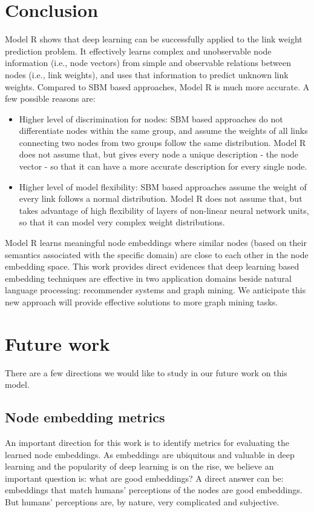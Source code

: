 \documentclass[book,12pt]{WSUThesis}
\theoremstyle{definition}
\begin{document}
\section{Conclusion}
Model R shows that deep learning can be successfully applied to the link weight prediction problem.
It effectively learns complex and unobservable node information (i.e., node vectors) from simple and observable relations between nodes (i.e., link weights),
and uses that information to predict unknown link weights.
Compared to SBM based approaches, Model R is much more accurate.
A few possible reasons are:
\begin{itemize}
	\item Higher level of discrimination for nodes:
	SBM based approaches do not differentiate nodes within the same group,
	and assume the weights of all links connecting two nodes from two groups
	follow the same distribution.
	Model R does not assume that,
	but gives every node a unique description - the node vector - so that
	it can have a more accurate description for every single node.
	\item Higher level of model flexibility:
	SBM based approaches assume the weight of every link follows
	a normal distribution.
	Model R does not assume that, but takes advantage of high flexibility of
	layers of non-linear neural network units,
	so that it can model very complex weight distributions.
\end{itemize}
Model R learns meaningful node embeddings where similar nodes (based on their semantics associated with the specific domain) are close to each other in the node embedding space.
This work provides direct evidences that deep learning based embedding techniques are effective in two application domains beside natural language processing: recommender systems and graph mining.
We anticipate this new approach will provide effective solutions to more
graph mining tasks.

\section{Future work}
There are a few directions we would like to study in our future work on this model.

\subsection{Node embedding metrics}
An important direction for this work is to identify metrics for evaluating the learned node embeddings.
As embeddings are ubiquitous and valuable in deep learning and the popularity of deep learning is on the rise, we believe an important question is: what are good embeddings?
A direct answer can be: embeddings that match humans' perceptions of the nodes are good embeddings.
But humans' perceptions are, by nature, very complicated and subjective.
\end{document}
